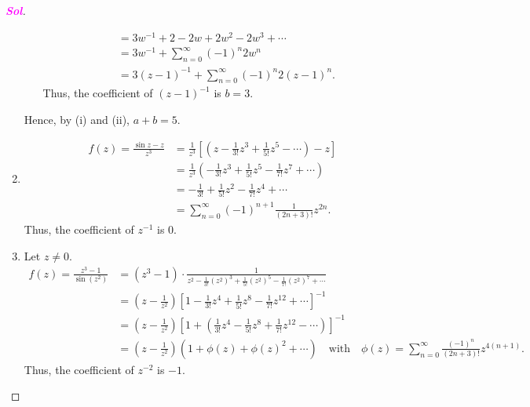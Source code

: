 \documentclass{article}
\newcommand{\inv}[1]{#1^{-1}}
\theoremstyle{definition}
\newcommand{\of}[1]{\left( #1 \right)}
\newcommand{\sol}{\textcolor{magenta}{\bf Sol}}
\begin{document}
\begin{proof}[\sol]
\begin{enumerate}[(1)]
\begin{enumerate}[(i)]
\begin{align*}
				&=3\inv{w}+2-2w+2w^2-2w^3+\cdots\\
				&=3w^{-1}+\sum_{n=0}^\infty (-1)^n2w^n\\
				&=3(z-1)^{-1}+\sum_{n=0}^\infty (-1)^n2(z-1)^n.
			\end{align*} Thus, the coefficient of $(z-1)^{-1}$ is $b=3$.
		\end{enumerate}
		Hence, by (i) and (ii), $a+b=5$.
		\vspace{4pt}
		\item \begin{align*}
			f(z)=\frac{\sin z-z}{z^3}&=\frac{1}{z^3}\left[\of{z-\frac{1}{3!}z^3+\frac{1}{5!}z^5-\cdots}-z\right]\\
			&=\frac{1}{z^3}\of{-\frac{1}{3!}z^3+\frac{1}{5!}z^5-\frac{1}{7!}z^7+\cdots}\\
			&=-\frac{1}{3!}+\frac{1}{5!}z^2-\frac{1}{7!}z^4+\cdots\\
			&=\sum_{n=0}^\infty(-1)^{n+1}\frac{1}{(2n+3)!}z^{2n}.
		\end{align*}
		Thus, the coefficient of $z^{-1}$ is $0$.
		\vspace{4pt}
		\item Let $z\neq 0$. \begin{align*}
			f(z)=\frac{z^3-1}{\sin(z^2)}&=(z^3-1)\cdot\frac{1}{\displaystyle z^2-\frac{1}{3!}(z^2)^3+\frac{1}{5!}(z^2)^5-\frac{1}{7!}(z^2)^7+\cdots}\\
			&=\of{z-\frac{1}{z^2}}\left[1-\frac{1}{3!}z^4+\frac{1}{5!}z^8-\frac{1}{7!}z^{12}+\cdots\right]^{-1}\\
			&=\of{z-\frac{1}{z^2}}\left[1+\of{\frac{1}{3!}z^4-\frac{1}{5!}z^8+\frac{1}{7!}z^{12}-\cdots}\right]^{-1}\\
			&=\of{z-\frac{1}{z^2}}\of{1+\phi(z)+\phi(z)^2+\cdots}\quad\text{with}\quad\phi(z)=\sum_{n=0}^\infty\frac{(-1)^{n}}{(2n+3)!}z^{4(n+1)}.
		\end{align*}
		Thus, the coefficient of $z^{-2}$ is $-1$.
	\end{enumerate}
\end{proof}
\end{document}
